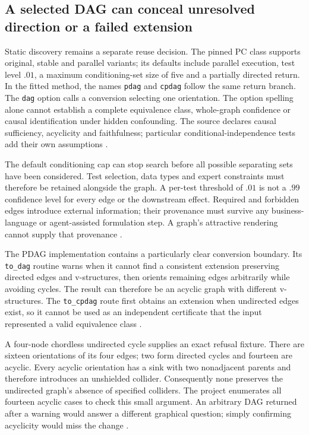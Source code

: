 \subsection{A selected DAG can conceal unresolved direction or a failed extension}

Static discovery remains a separate reuse decision. The pinned PC class
supports original, stable and parallel variants; its defaults include
parallel execution, test level $.01$, a maximum conditioning-set size of
five and a partially directed return. In the fitted method, the names
\texttt{pdag} and \texttt{cpdag} follow the same return branch.
The \texttt{dag} option calls a conversion selecting one orientation.
The option spelling alone cannot establish a complete equivalence class,
whole-graph confidence or causal identification under hidden confounding.
The source declares causal sufficiency, acyclicity and faithfulness;
particular conditional-independence tests add their own assumptions
\citep{exec13_pgmpy_reuse_primary}.

The default conditioning cap can stop search before all possible separating
sets have been considered. Test selection, data types and expert constraints
must therefore be retained alongside the graph. A per-test threshold of
$.01$ is not a $.99$ confidence level for every edge or the downstream
effect. Required and forbidden edges introduce external information;
their provenance must survive any business-language or agent-assisted
formulation step. A graph's attractive rendering cannot supply that
provenance \citep{exec13_pgmpy_reuse_primary}.

The PDAG implementation contains a particularly clear conversion boundary.
Its \texttt{to\_dag} routine warns when it cannot find a consistent
extension preserving directed edges and v-structures, then orients remaining
edges arbitrarily while avoiding cycles. The result can therefore be an
acyclic graph with different v-structures. The \texttt{to\_cpdag} route
first obtains an extension when undirected edges exist, so it cannot be
used as an independent certificate that the input represented a valid
equivalence class \citep{exec13_pgmpy_reuse_primary}.

A four-node chordless undirected cycle supplies an exact refusal fixture.
There are sixteen orientations of its four edges; two form directed cycles
and fourteen are acyclic. Every acyclic orientation has a sink with two
nonadjacent parents and therefore introduces an unshielded collider.
Consequently none preserves the undirected graph's absence of specified
colliders. The project enumerates all fourteen acyclic cases to check this
small argument. An arbitrary DAG returned after a warning would answer a
different graphical question; simply confirming acyclicity would miss the
change \citep{exec13_pgmpy_reuse_oracle}.

